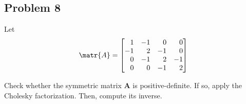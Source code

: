 \subsection{Problem 8}
Let
\begin{equation*}
    \matr{A} = 
    \begin{bmatrix}
        \phantom{-}1 & -1 & \phantom{-}0 & \phantom{-}0 \\
        -1 & \phantom{-}2 & -1 & \phantom{-}0 \\
        \phantom{-}0 & -1 & \phantom{-}2 & -1 \\
        \phantom{-}0 & \phantom{-}0 & -1 & \phantom{-}2
    \end{bmatrix}
\end{equation*}

Check whether the symmetric matrix $\mathbf{A}$ is positive-definite. If so, apply the Cholesky factorization. Then, compute its inverse.



